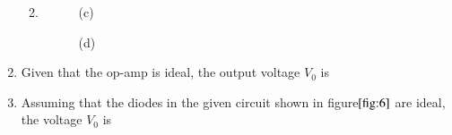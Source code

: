 \documentclass[journal]{IEEEtran}
\numberwithin{equation}{enumi}
\numberwithin{figure}{enumi}
\begin{document}
\begin{enumerate}
\begin{enumerate}
\begin{figure}[H]
    \end{figure}

    \item[]

    \begin{figure}[H]
        \centering

        \begin{minipage}{0.45\linewidth}
            \centering
            
            \caption*{(c)}
        \end{minipage}%
        \hfill
        \begin{minipage}{0.45\linewidth}
            \centering
            
            \caption*{(d)}
        \end{minipage}

    \end{figure}
    
\end{enumerate}

\item Given that the op-amp is ideal, the output voltage $V_0$ is
	\begin{figure}[!ht]
    
			\centering
			
			\caption{}
			\label{fig:5}
		\end{figure}

\begin{enumerate}
\end{enumerate}

\item Assuming that the diodes in the given circuit shown in figure$\ref{fig:6}$ are ideal, the voltage $V_0$ is
\begin{figure}[!ht]
    
			\centering
			
			\caption{}
			\label{fig:6}
		\end{figure}

\begin{enumerate}
\end{enumerate}


\end{enumerate}
\end{document}
